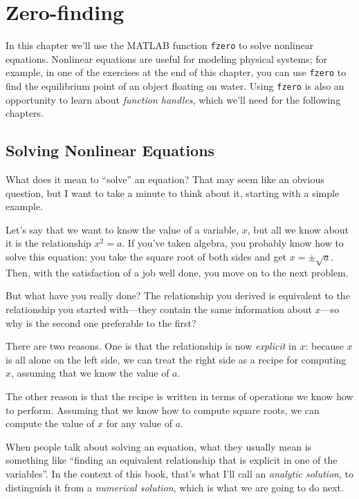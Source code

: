 \chapter{Zero-finding}
\label{fzero}

In this chapter we'll use the MATLAB function {\tt fzero} to solve nonlinear equations.
Nonlinear equations are useful for modeling physical systems; for example, in one of
the exercises at the end of this chapter, you can use {\tt fzero} to find the equilibrium point of an object floating on water.
Using {\tt fzero} is also an opportunity to learn about {\em function handles}, which we'll need for the following chapters.

\section{Solving Nonlinear Equations}


What does it mean to ``solve'' an equation?  That may seem like an
obvious question, but I want to take a minute to think about it,
starting with a simple example.

Let's say that we want to know the
value of a variable, $x$, but all we know about it is the relationship
$x^2 = a$. If you've taken algebra, you probably know how to solve this
equation: you take the square root of both sides and get
$x = \pm \sqrt{a}$.  Then, with the satisfaction of a job well done,
you move on to the next problem.


But what have you really done?  The relationship you derived is
equivalent to the relationship you started with---they contain the
same information about $x$---so why is the second one preferable
to the first?

There are two reasons.  One is that the relationship is now \emph{explicit} in $x$: because $x$ is all alone on the left side, we can treat the right side as a recipe for computing $x$, assuming that we know the value of $a$.


The other reason is that the recipe is written in terms of operations
we know how to perform.  Assuming that we know how to compute square
roots, we can compute the value of $x$ for any value of $a$.

When people talk about solving an equation, what they usually mean
is something like ``finding an equivalent relationship that is
explicit in one of the variables''.  In the context of this book,
that's what I'll call an {\em analytic solution}, to distinguish
it from a {\em numerical solution}, which is what we are going to
do next.

